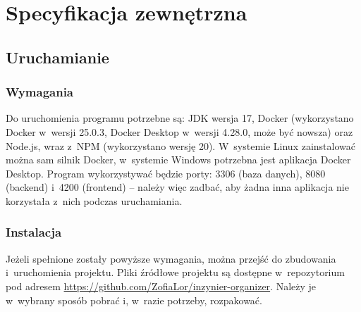 \documentclass[a4paper,twoside,12pt]{book}
\begin{document}
\chapter{Specyfikacja zewnętrzna}
\label{ch:04}


\section{Uruchamianie}

\subsection{Wymagania}
Do uruchomienia programu potrzebne są: JDK wersja 17, Docker (wykorzystano Docker w~wersji 25.0.3, Docker Desktop w~wersji 4.28.0, może być nowsza) oraz Node.js, wraz z~NPM (wykorzystano wersję 20). W~systemie Linux zainstalować można sam silnik Docker, w~systemie Windows potrzebna jest aplikacja Docker Desktop. Program wykorzystywać będzie porty: 3306 (baza danych), 8080 (backend) i~4200 (frontend) -- należy więc zadbać, aby żadna inna aplikacja nie korzystała z~nich podczas uruchamiania.

\subsection{Instalacja}

Jeżeli spełnione zostały powyższe wymagania, można przejść do zbudowania i~uruchomienia projektu. Pliki źródłowe projektu są dostępne w~repozytorium pod adresem \url{https://github.com/ZofiaLor/inzynier-organizer}. Należy je w~wybrany sposób pobrać i, w~razie potrzeby, rozpakować.
\end{document}

